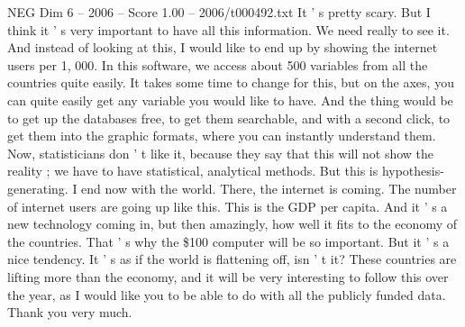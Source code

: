 \begin{textsample}{NEG Dim 6 – 2006 – Score 1.00 – 2006/t000492.txt}
It ' s pretty scary.
But I think it ' s very important to have all this information.
We need really to see it.
And instead of looking at this, I would like to end up by showing the internet users per 1, 000.
In this software, we access about 500 variables from all the countries quite easily.
It takes some time to change for this, but on the axes, you can quite easily get any variable you would like to have.
And the thing would be to get up the databases free, to get them searchable, and with a second click, to get them into the graphic formats, where you can instantly understand them.
Now, statisticians don ' t like it, because they say that this will not show the reality ; we have to have statistical, analytical methods.
But this is hypothesis-generating.
I end now with the world.
There, the internet is coming.
The number of internet users are going up like this.
This is the GDP per capita.
And it ' s a new technology coming in, but then amazingly, how well it fits to the economy of the countries.
That ' s why the \$100 computer will be so important.
But it ' s a nice tendency.
It ' s as if the world is flattening off, isn ' t it?
These countries are lifting more than the economy, and it will be very interesting to follow this over the year, as I would like you to be able to do with all the publicly funded data.
Thank you very much.

\end{textsample}
